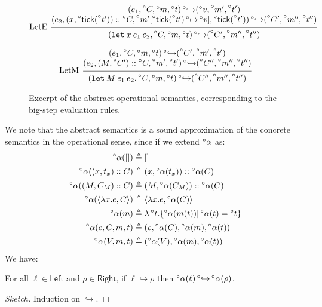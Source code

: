 \documentclass[acmsmall,screen,review]{acmart}\settopmatter{printfolios=true,printccs=false,printacmref=false}
\newcommand*{\cons}{::}
\newcommand*{\A}[1]{\prescript{\circ}{}{#1}}
\newcommand*{\Left}{\mathsf{Left}}
\newcommand*{\Right}{\mathsf{Right}}
\newcommand*{\mem}{m}
\newcommand*{\semarrow}{\hookrightarrow}
\newcommand*{\tick}{\mathsf{tick}}
\begin{document}
\begin{figure}[t!]
  \[
    \begin{prooftree}
      \hypo{
        \begin{matrix}
          (e_{1}, \A{C}, \A\mem, \A{t})
          \A\semarrow
          (\A{v}, \A{\mem'}, \A{t'}) \\
          (e_{2}, (x, \A\tick(\A{t'}))\cons \A{C}, \A{\mem'}[\A\tick(\A{t'})\A\mapsto \A{v}], \A\tick(\A{t'}))
          \A\semarrow
          (\A{C'}, \A{\mem''}, \A{t''})
        \end{matrix}
      }
      \infer[left label=LetE]1{
      (\mathtt{let}\:x\:e_1\:e_2, \A{C}, \A\mem, \A{t})
      \A\semarrow
      (\A{C'}, \A{\mem''}, \A{t''})
      }
    \end{prooftree}
  \]

  \[
    \begin{prooftree}
      \hypo{
        \begin{matrix}
          (e_{1}, \A{C}, \A\mem, \A{t})
          \A\semarrow
          (\A{C'}, \A{\mem'}, \A{t'}) \\
          (e_{2}, (M, \A{C'})\cons \A{C}, \A{\mem'}, \A{t'})
          \A\semarrow
          (\A{C''}, \A{\mem''}, \A{t''})
        \end{matrix}
      }
      \infer[left label=LetM]1{
      (\mathtt{let}\:M\:e_{1}\:e_{2}, \A{C}, \A\mem, \A{t})
      \A\semarrow
      (\A{C''}, \A{\mem''}, \A{t''})
      }
    \end{prooftree}
  \]
  \caption{Excerpt of the abstract operational semantics, corresponding to the big-step evaluation rules.}
  \label{fig:absreach}
\end{figure}
We note that the abstract semantics is a sound approximation of the concrete semantics in the operational sense, since if we extend $\A\alpha$ as:
\begin{align*}
  \A\alpha([])                          & \triangleq []                                                  \\
  \A\alpha((x,t_x)\cons C)              & \triangleq(x,\A\alpha(t_x))\cons\A\alpha(C)                    \\
  \A\alpha((M,C_M)\cons C)              & \triangleq(M,\A\alpha(C_M))\cons\A\alpha(C)                    \\
  \A\alpha(\langle\lambda x.e,C\rangle) & \triangleq\langle\lambda x.e,\A\alpha(C)\rangle                \\
  \A\alpha(\mem)                        & \triangleq\lambda\A{t}.\{\A\alpha(\mem(t))|\A\alpha(t)=\A{t}\} \\
  \A\alpha(e,C,\mem,t)                  & \triangleq(e,\A\alpha(C),\A\alpha(\mem),\A\alpha(t))           \\
  \A\alpha(V,\mem,t)                    & \triangleq(\A\alpha(V),\A\alpha(\mem),\A\alpha(t))
\end{align*}
We have:
\begin{lemma}
  For all $\ell\in\Left$ and $\rho\in\Right$, if $\ell\semarrow\rho$ then $\A\alpha(\ell)\A\semarrow\A\alpha(\rho)$.
\end{lemma}
\begin{proof}[Sketch]
  Induction on $\semarrow$.
\end{proof}
\end{document}
